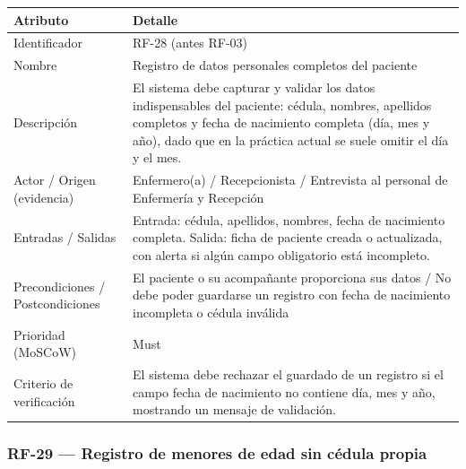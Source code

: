 \documentclass[11pt,a4paper]{article}
\begin{document}
	\begin{longtable}{p{} p{}}
		
		\toprule
		\textbf{Atributo} & \textbf{Detalle} \\
		\midrule
		\endhead
		
		Identificador & RF-28 (antes RF-03) \\
		Nombre & Registro de datos personales completos del paciente \\
		Descripción & El sistema debe capturar y validar los datos indispensables del paciente: cédula, nombres, apellidos completos y fecha de nacimiento completa (día, mes y año), dado que en la práctica actual se suele omitir el día y el mes. \\
		Actor / Origen (evidencia) & Enfermero(a) / Recepcionista / Entrevista al personal de Enfermería y Recepción \\
		Entradas / Salidas & Entrada: cédula, apellidos, nombres, fecha de nacimiento completa. Salida: ficha de paciente creada o actualizada, con alerta si algún campo obligatorio está incompleto. \\
		Precondiciones / Postcondiciones & El paciente o su acompañante proporciona sus datos / No debe poder guardarse un registro con fecha de nacimiento incompleta o cédula inválida \\
		Prioridad (MoSCoW) & Must \\
		Criterio de verificación & El sistema debe rechazar el guardado de un registro si el campo fecha de nacimiento no contiene día, mes y año, mostrando un mensaje de validación. \\
		\bottomrule
	\end{longtable}
	
	\subsubsection{RF-29 --- Registro de menores de edad sin cédula propia}
	
\end{document}
